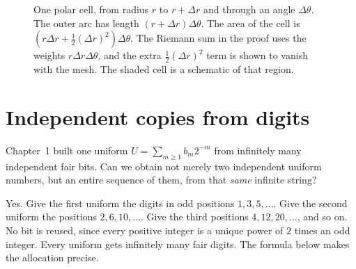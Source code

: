 \begin{figure}[ht]
\centering
{}
\caption{One polar cell, from radius $r$ to $r+\Delta r$ and through an angle $\Delta\theta$. The outer arc has length $(r+\Delta r)\Delta\theta$. The area of the cell is $(r\Delta r+\tfrac12(\Delta r)^2)\Delta\theta$. The Riemann sum in the proof uses the weights $r\Delta r\Delta\theta$, and the extra $\tfrac12(\Delta r)^2$ term is shown to vanish with the mesh. The shaded cell is a schematic of that region.}
\label{fig:polar}
\end{figure}

\section{Independent copies from digits}

Chapter~1 built one uniform $U=\sum_{m\ge1}b_m 2^{-m}$ from infinitely many independent fair bits. Can we obtain not merely two independent uniform numbers, but an entire sequence of them, from that \emph{same} infinite string?

Yes. Give the first uniform the digits in odd positions $1,3,5,\ldots$. Give the second uniform the positions $2,6,10,\ldots$. Give the third positions $4,12,20,\ldots$, and so on. No bit is reused, since every positive integer is a unique power of $2$ times an odd integer. Every uniform gets infinitely many fair digits. The formula below makes the allocation precise.

